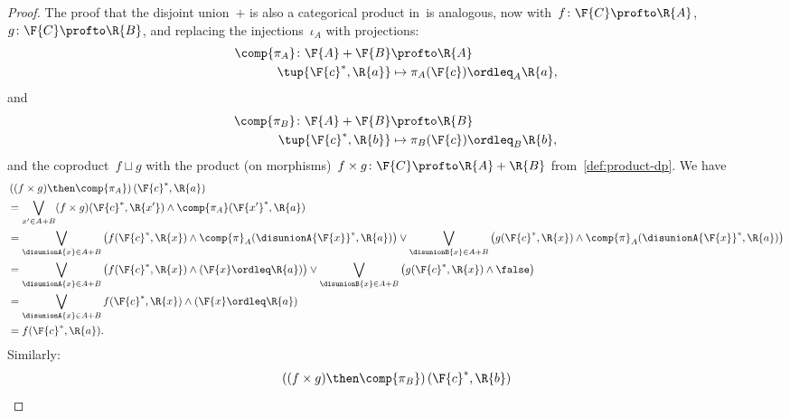 \begin{proof}
    The proof that the disjoint union~$+$ is also a categorical product in~\DP is analogous, now with~$f \colon \F{C} \profto \R{A}$,~$g \colon \F{C} \profto \R{B}$, and replacing the injections~$\iota_A$ with projections:
    \begin{equation}
        \begin{aligned}
            \comp{\pi_A} \colon \F{A}+\F{B} &\profto \R{A}\\
            \tup{\F{c}^*,\R{a}}&\mapsto \pi_A(\F{c})\ordleq_A \R{a},
        \end{aligned}
    \end{equation}
    and
    \begin{equation}
        \begin{aligned}
            \comp{\pi_B} \colon \F{A}+\F{B} &\profto \R{B}\\
            \tup{\F{c}^*,\R{b}}&\mapsto \pi_B(\F{c})\ordleq_B \R{b},
        \end{aligned}
    \end{equation}
    and the coproduct~$f \sqcup g$ with the product (on morphisms)~$f \times g \colon \F{C} \profto \R{A} + \R{B}$ from~\cref{def:product-dp}. We have
    \begin{equation}
        \begin{aligned}
            &\left((f\times g)\then \comp{\pi_A}\right)(\F{c}^*,\R{a})\\
            &=\bigvee_{x'\in A+B} (f\times g)(\F{c}^*,\R{x'}) \wedge \comp{\pi_A}(\F{x'}^*,\R{a})\\
            &=\bigvee_{\disunionA{x}\in A+B}\left( f(\F{c}^*,\R{x}) \wedge \comp{\pi}_A(\disunionA{\F{x}}^*,\R{a})\right) \vee
            \bigvee_{\disunionB{x}\in A+B}\left( g(\F{c}^*,\R{x}) \wedge \comp{\pi}_A(\disunionA{\F{x}}^*,\R{a})\right)\\
            &=\bigvee_{\disunionA{x}\in A+B}\left( f(\F{c}^*,\R{x}) \wedge (\F{x}\ordleq \R{a})\right) \vee
            \bigvee_{\disunionB{x}\in A+B}\left( g(\F{c}^*,\R{x}) \wedge \false \right)\\
            &=\bigvee_{\disunionA{x}\in A+B} f(\F{c}^*,\R{x}) \wedge (\F{x}\ordleq \R{a})\\
            &=f(\F{c}^*,\R{a}).
        \end{aligned}
    \end{equation}
    Similarly:
    \begin{equation}
        \begin{aligned}
            &\left((f\times g)\then \comp{\pi_B}\right)(\F{c}^*,\R{b})\\

\end{aligned}
\end{equation}
\end{proof}
